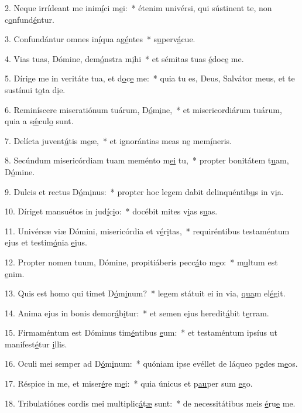 2. Neque irrídeant me inim\uline{í}ci m\uline{e}i:~* étenim univérsi, qui sústinent te, non c\uline{o}nfund\uline{é}ntur.\par 
3. Confundántur omnes in\uline{í}qua ag\uline{é}ntes~* s\uline{u}perv\uline{á}cue.\par 
4. Vias tuas, Dómine, dem\uline{ó}nstra m\uline{i}hi~* et sémitas tuas \uline{é}doc\uline{e} me.\par 
5. Dírige me in veritáte tua, et d\uline{o}c\uline{e} me:~* quia tu es, Deus, Salvátor meus, et te sustínui t\uline{o}ta d\uline{i}e.\par 
6. Reminíscere miseratiónum tuárum, D\uline{ó}m\uline{i}ne,~* et misericordiárum tuárum, quia a s\uline{ǽ}cul\uline{o} sunt.\par 
7. Delícta juvent\uline{ú}tis m\uline{e}æ,~* et ignorántias meas n\uline{e} mem\uline{í}neris.\par 
8. Secúndum misericórdiam tuam meménto m\uline{e}\uline{i} tu,~* propter bonitátem t\uline{u}am, D\uline{ó}mine.\par 
9. Dulcis et rectus D\uline{ó}m\uline{i}nus:~* propter hoc legem dabit delinquéntib\uline{u}s in v\uline{i}a.\par 
10. Díriget mansuétos in jud\uline{í}c\uline{i}o:~* docébit mites v\uline{i}as s\uline{u}as.\par 
11. Univérsæ viæ Dómini, misericórdia et v\uline{é}r\uline{i}tas,~* requiréntibus testaméntum ejus et testim\uline{ó}nia \uline{e}jus.\par 
12. Propter nomen tuum, Dómine, propitiáberis pecc\uline{á}to m\uline{e}o:~* m\uline{u}ltum est \uline{e}nim.\par 
13. Quis est homo qui timet D\uline{ó}m\uline{i}num?~* legem státuit ei in via, \uline{qua}m el\uline{é}git.\par 
14. Anima ejus in bonis demor\uline{á}b\uline{i}tur:~* et semen ejus heredit\uline{á}bit t\uline{e}rram.\par 
15. Firmaméntum est Dóminus tim\uline{é}ntibus \uline{e}um:~* et testaméntum ipsíus ut manifest\uline{é}tur \uline{i}llis.\par 
16. Oculi mei semper ad D\uline{ó}m\uline{i}num:~* quóniam ipse evéllet de láqueo p\uline{e}des m\uline{e}os.\par 
17. Réspice in me, et miser\uline{é}re m\uline{e}i:~* quia únicus et p\uline{au}per sum \uline{e}go.\par 
18. Tribulatiónes cordis mei multiplic\uline{á}t\uline{æ} sunt:~* de necessitátibus meis \uline{é}ru\uline{e} me.\par 
